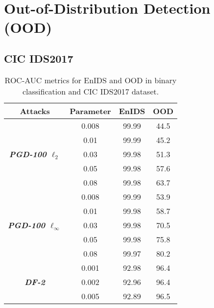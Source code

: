 \documentclass[conference]{IEEEtran}
\begin{document}
	
	\section{Out-of-Distribution Detection (OOD)}
	
	
	\subsection{CIC IDS2017}
	

	
	
	\begin{minipage}{\textwidth}
	\begin{table*}[H]
		\caption{ROC-AUC metrics for EnIDS and OOD in binary classification and CIC IDS2017 dataset.}
		\small
		\setlength{\tabcolsep}{1pt}
		\centering
		\label{tab:cic_bin_ood}
		
		
		\begin{tabular}{|c|c|c|c|}
			\hline
			Attacks & Parameter & EnIDS & OOD
			\\
			\hline
			\multirow{5}{*}{\textbf{\textsl{PGD-100 $\ell_2$}}}& 0.008 & 99.99 & 44.5
			\\
			
			& 0.01 & 99.99 & 45.2
			\\
			
			& 0.03 & 99.98 & 51.3
			\\
			
			& 0.05 & 99.98 & 57.6
			\\
			
			& 0.08 & 99.98 & 63.7
			\\
			\hline
			\multirow{5}{*}{\textbf{\textsl{PGD-100 $\ell_\infty$}}}& 0.008 & 99.99 & 53.9
			\\
			
			& 0.01 & 99.98 & 58.7
			\\
			
			& 0.03 & 99.98 & 70.5
			\\
			
			& 0.05 & 99.98 & 75.8
			\\
			
			& 0.08 & 99.97 & 80.2
			\\
			\hline
			\multirow{5}{*}{\textbf{\textsl{DF-2}}}& 0.001 & 92.98 & 96.4
			\\
			
			& 0.002 & 92.96 & 96.4
			\\
			
			& 0.005 & 92.89 & 96.5
			\\
			

\end{tabular}
\end{table*}
\end{minipage}
\end{document}

